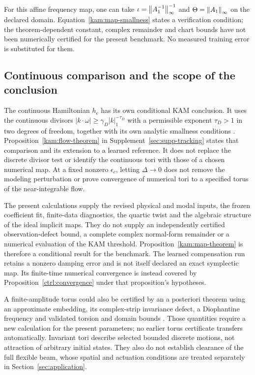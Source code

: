 For this affine frequency map, one can take
$\iota=\left\lVert A_1^{-1}\right\rVert_\infty^{-1}$ and
$\Theta=\left\lVert A_1\right\rVert_\infty$ on the declared domain. Equation~\eqref{kam:map-smallness} states a verification condition; the theorem-dependent constant, complex remainder and chart bounds have not been numerically certified for the present benchmark. No measured training error is substituted for them.

\subsection{Continuous comparison and the scope of the conclusion}
\label{kam:scope}

The continuous Hamiltonian $h_c$ has its own conditional KAM conclusion. It uses the continuous divisors $|k\cdot\omega|\ge\gamma_D|k|_1^{-\tau_D}$ with a permissible exponent $\tau_D>1$ in two degrees of freedom, together with its own analytic smallness conditions \citep{poschel}. Proposition~\ref{kam:flow-theorem} in Supplement~\ref{sec:supp-tracking} states that comparison and its extension to a learned reference. It does not replace the discrete divisor test or identify the continuous tori with those of a chosen numerical map. At a fixed nonzero $\epsilon_c$, letting $\Delta\to0$ does not remove the modeling perturbation or prove convergence of numerical tori to a specified torus of the near-integrable flow.

The present calculations supply the revised physical and modal inputs, the frozen coefficient fit, finite-data diagnostics, the quartic twist and the algebraic structure of the ideal implicit maps. They do not supply an independently certified observation-defect bound, a complete complex normal-form remainder or a numerical evaluation of the KAM threshold. Proposition~\ref{kam:map-theorem} is therefore a conditional result for the benchmark. The learned compensation run retains a nonzero damping error and is not itself declared an exact symplectic map. Its finite-time numerical convergence is instead covered by Proposition~\ref{ctrl:convergence} under that proposition's hypotheses.

A finite-amplitude torus could also be certified by an a posteriori theorem using an approximate embedding, its complex-strip invariance defect, a Diophantine frequency and validated torsion and domain bounds \citep{haro2019aposteriori}. Those quantities require a new calculation for the present parameters; no earlier torus certificate transfers automatically. Invariant tori describe selected bounded discrete motions, not attraction of arbitrary initial states. They also do not establish clearance of the full flexible beam, whose spatial and actuation conditions are treated separately in Section~\ref{sec:application}.
